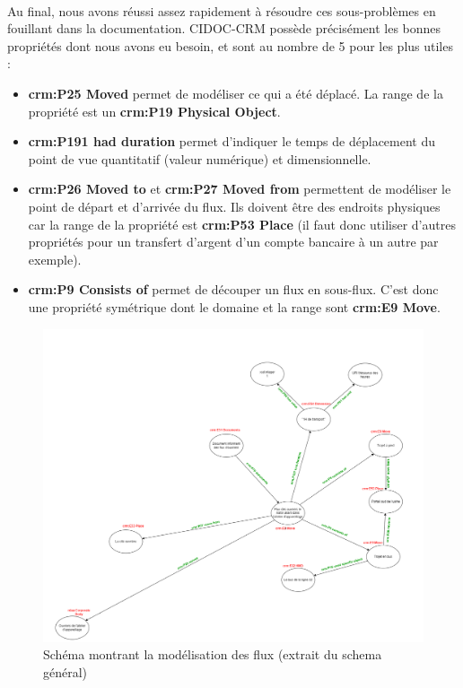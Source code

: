 \paragraph{} \hspace{10mm}
Au final, nous avons réussi assez rapidement à résoudre ces sous-problèmes en fouillant dans la documentation. CIDOC-CRM possède précisément les bonnes propriétés dont nous avons eu besoin, et sont au nombre de 5 pour les plus utiles : 
\begin{itemize}
    \item[\ding{103}] \textbf{crm:P25 Moved} permet de modéliser ce qui a été déplacé. La range de la propriété est un \textbf{crm:P19 Physical Object}.
    \item[\ding{103}] \textbf{crm:P191 had duration} permet d'indiquer le temps de déplacement du point de vue quantitatif (valeur numérique) et dimensionnelle.
    \item[\ding{103}] \textbf{crm:P26 Moved to} et \textbf{crm:P27 Moved from} permettent de modéliser le point de départ et d'arrivée du flux. Ils doivent être des endroits physiques car la range de la propriété est \textbf{crm:P53 Place} (il faut donc utiliser d'autres propriétés pour un transfert d'argent d'un compte bancaire à un autre par exemple).
    \item[\ding{103}] \textbf{crm:P9 Consists of} permet de découper un flux en sous-flux. C'est donc une propriété symétrique dont le domaine et la range sont \textbf{crm:E9 Move}.
\end{itemize}

\begin{figure} [H]
    \centering
    \includegraphics[width=1\textwidth]{assets/ontologie/screen_flux.png}
    \caption{Schéma montrant la modélisation des flux (extrait du schema général)}
    \label{fig:screenFlux}
\end{figure}

